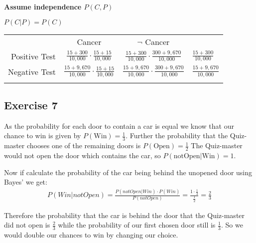 \textbf{Assume independence $P(C, P)$}

$P(C|P) = P(C)$

\begin{tabular}{ r|c|c|l }
\multicolumn{1}{r}{}
      &  \multicolumn{1}{c}{Cancer}
               &  \multicolumn{1}{c}{$\neg$ Cancer} \\
               \cline{2-3}
Positive Test  & $\frac{15+300}{10,000}\cdot\frac{15+15}{10,000}$   & $\frac{15+300}{10,000}\cdot\frac{300+9,670}{10,000}$  & $\frac{15+300}{10,000}$\\ 
               \cline{2-3}
Negative Test  & $\frac{15+9,670}{10,000}\cdot\frac{15+15}{10,000}$ & $\frac{15+9,670}{10,000}\cdot\frac{300+9,670}{10,000}$ & $\frac{15+9,670}{10,000}$\\
               \cline{2-3}
\multicolumn{1}{r}{} 
      & \multicolumn{1}{c}{} 
              & \multicolumn{1}{c}{} 
                      & \multicolumn{1}{c}{}\\
\end{tabular}

\subsection*{Exercise 7}
As the probability for each door to contain a car is equal we know that our chance to win is given by $P(\mbox{Win}) = \frac{1}{3}$.
Further the probability that the Quiz-master chooses one of the remaining doors is $P(\mbox{Open}) = \frac{1}{2}$
The Quiz-master would not open the door which contains the car, so $P(\mbox{notOpen}|\mbox{Win}) = 1$.

Now if calculate the probability of the car being behind the unopened door using Bayes' we get:
\begin{align*}
P(Win|notOpen) = \frac{P(notOpen|Win) \cdot P(Win)}{P(notOpen)} = \frac{1 \cdot \frac{1}{3}}{\frac{1}{2}} = \frac{2}{3}
\end{align*}

Therefore the probability that the car is behind the door that the Quiz-master did not open is $\frac{2}{3}$ while the probability of our first chosen door still is $\frac{1}{3}$. So we would double our chances to win by changing our choice.